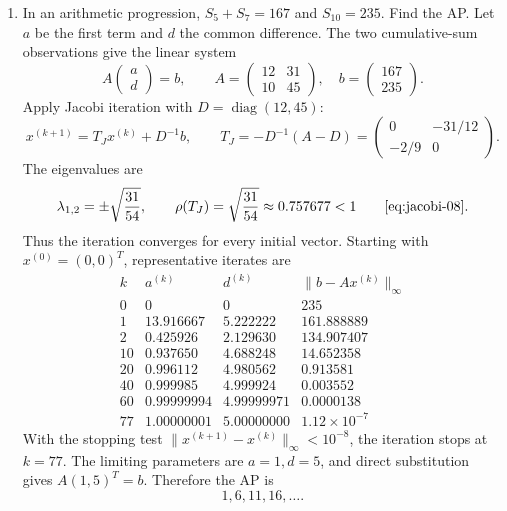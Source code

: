 \begin{enumerate}[leftmargin=4mm,itemsep=9pt]
The incircle diagram is generated by this script:
\par\smallskip
\noindent\textbf{Code reference -}
\par\noindent{}
\par\smallskip
\newpage
\addtocounter{enumi}{1}
\item In an arithmetic progression, $S_5+S_7=167$ and $S_{10}=235$. Find the AP.
\solution Let $a$ be the first term and $d$ the common difference. The two cumulative-sum observations give the linear system
\[
A\begin{pmatrix}a\\d\end{pmatrix}=b,\qquad
A=\begin{pmatrix}12&31\\10&45\end{pmatrix},\quad
b=\begin{pmatrix}167\\235\end{pmatrix}.
\]
Apply Jacobi iteration with $D=\operatorname{diag}(12,45)$:
\[
x^{(k+1)}=T_Jx^{(k)}+D^{-1}b,\qquad
T_J=-D^{-1}(A-D)=
\begin{pmatrix}0&-31/12\\-2/9&0\end{pmatrix}.
\]
The eigenvalues are
\[
\lambda_{1,2}=\pm\sqrt{\frac{31}{54}},\qquad
\rho(T_J)=\sqrt{\frac{31}{54}}\approx0.757677<1\qquad\eqref{eq:jacobi-08}.
\]
Thus the iteration converges for every initial vector. Starting with $x^{(0)}=(0,0)^T$, representative iterates are
\[
\begin{array}{c|rr|r}
k&a^{(k)}&d^{(k)}&\|b-Ax^{(k)}\|_\infty\\ \hline
0&0&0&235\\
1&13.916667&5.222222&161.888889\\
2&0.425926&2.129630&134.907407\\
10&0.937650&4.688248&14.652358\\
20&0.996112&4.980562&0.913581\\
40&0.999985&4.999924&0.003552\\
60&0.99999994&4.99999971&0.0000138\\
77&1.00000001&5.00000000&1.12\times10^{-7}
\end{array}
\]
With the stopping test $\|x^{(k+1)}-x^{(k)}\|_\infty<10^{-8}$, the iteration stops at $k=77$. The limiting parameters are $a=1,d=5$, and direct substitution gives $A(1,5)^T=b$. Therefore the AP is
\[
\boxed{1,6,11,16,\ldots}.

\]
\end{enumerate}
